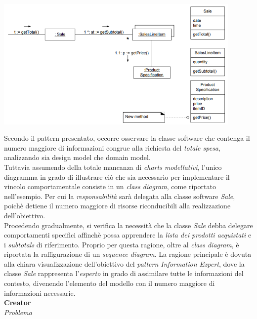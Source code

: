 \documentclass{article}
\begin{document}
\begin{center}
    \includegraphics*[width=0.9\textwidth]{foto 1.png}
\end{center}\vspace*{7pt}
Secondo il pattern presentato, occorre osservare la classe software che contenga il numero maggiore di informazioni congrue alla richiesta del \textit{totale spesa}, analizzando sia design model che domain model.\vspace*{7pt}\\
Tuttavia assumendo della totale mancanza di \textit{charts modellativi}, l'unico diagramma in grado di illustrare ciò che sia necessario per implementare il vincolo comportamentale consiste in un \textit{class diagram}, come riportato nell'esempio. Per cui la \textit{responsabilità} sarà delegata alla classe software \textit{Sale}, poichè detiene il numero maggiore di risorse riconducibili alla realizzazione dell'obiettivo.\vspace*{7pt}\\
Procedendo gradualmente, si verifica la necessità che la classe \textit{Sale} debba delegare comportamenti specifici affinchè possa apprendere la \textit{lista dei prodotti acquistati} e i \textit{subtotals} di riferimento. Proprio per questa ragione, oltre al \textit{class diagram}, è riportata la raffigurazione di un \textit{sequence diagram}. La ragione principale è dovuta alla chiara visualizzazione dell'obiettivo del \textit{pattern Information Expert}, dove la classe \textit{Sale} rappresenta l'\textit{esperto} in grado di assimilare tutte le informazioni del contesto, divenendo l'elemento del modello con il numero maggiore di informazioni necessarie.\vspace*{14pt}\\
\textbf{Creator}\vspace*{7pt}\\
\textit{Problema}\\
\end{document}
